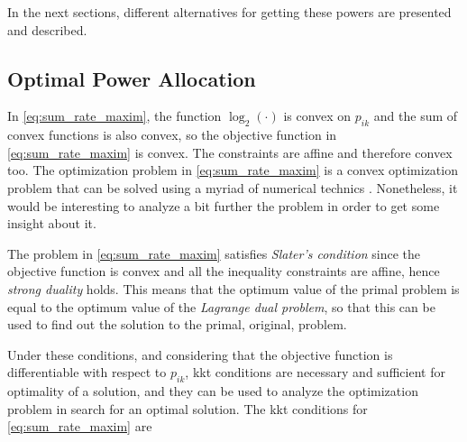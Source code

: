 In the next sections, different alternatives for getting these powers are
presented and described.

\subsection{Optimal Power Allocation}\label{ssec:optimal_power_allocation}

In \eqref{eq:sum_rate_maxim}, the function $\log_2(\cdot)$ is convex on $p_{ik}$
 and the sum of convex functions is also convex, so the objective function in
\eqref{eq:sum_rate_maxim} is convex. The constraints are affine and therefore
convex too. The optimization problem in \eqref{eq:sum_rate_maxim} is a convex
optimization problem that can be solved using a myriad of numerical technics
\cite{boyd_convex}. Nonetheless, it would be interesting to analyze a bit
further the problem in order to get some insight about it.

The problem in \eqref{eq:sum_rate_maxim} satisfies \emph{Slater's condition}
\cite{boyd_convex} since the objective function is convex and all the
inequality constraints are affine, hence \emph{strong duality} holds. This means
that the optimum value of the primal problem is equal to the optimum value of
the \emph{Lagrange dual problem}, so that this can be used to find out the
solution to the primal, original, problem.

Under these conditions, and considering that the objective function is
differentiable with respect to $p_{ik}$, \gls{kkt} conditions \cite{boyd_convex}
are necessary and sufficient for optimality of a solution, and they can be used
to analyze the optimization problem in search for an optimal solution. The
\gls{kkt} conditions for \eqref{eq:sum_rate_maxim} are

